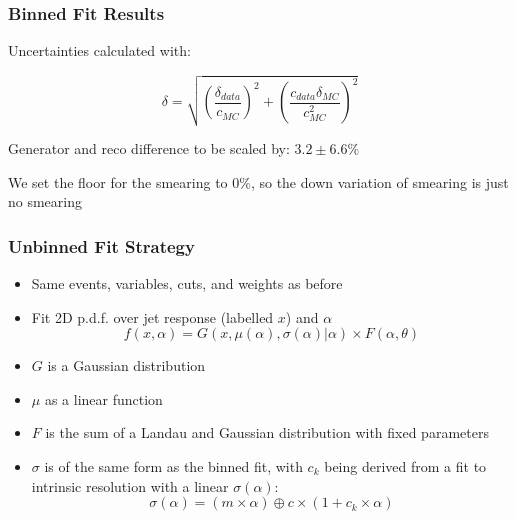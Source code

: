 \documentclass{beamer}
\begin{document}
\begin{frame}
  \frametitle{Binned Fit Results}

  Uncertainties calculated with:

  \[
  \delta = \sqrt{\left(\frac{\delta_{data}}{c_{MC}}\right)^2 +
    \left(\frac{c_{data}\delta_{MC}}{c_{MC}^2}\right)^2}
  \]

  \vfill

  \begin{center}
    Generator and reco difference to be scaled by: $3.2 \pm 6.6 \%$
  \end{center}

  \vfill

  We set the floor for the smearing to 0\%,
  so the down variation of smearing is just no smearing

\end{frame}


\begin{frame}
  \frametitle{Unbinned Fit Strategy}

  \begin{itemize}
  \item Same events, variables, cuts, and weights as before
  \item Fit 2D p.d.f. over jet response (labelled $x$) and $\alpha$
  \[
  f(x, \alpha) =
  G(x, \mu(\alpha), \sigma(\alpha)|\alpha)
  \times
  F(\alpha, \theta)
  \]
  \item $G$ is a Gaussian distribution
  \item $\mu$ as a linear function
  \item $F$ is the sum of a Landau and Gaussian distribution with fixed parameters
  \item $\sigma$ is of the same form as the binned fit,
    with $c_k$ being derived from a fit to
    intrinsic resolution with a linear $\sigma(\alpha)$:
  \[
  \sigma(\alpha) = (m \times \alpha) \oplus c \times (1 + c_k \times \alpha)
  \]
  \end{itemize}

\end{frame}
\end{document}
